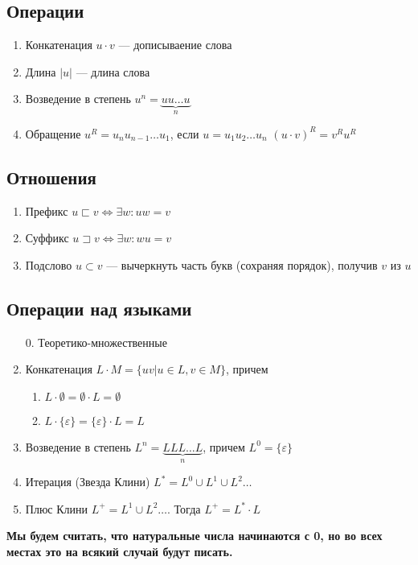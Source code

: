 \subsection{Операции}
\begin{enumerate}
    \item Конкатенация $u \cdot v$ --- дописываение слова
    \item Длина $|u|$ --- длина слова
    \item Возведение в степень $u^n = \underbrace{uu\dots u}_n$
    \item Обращение $u^R = u_nu_{n-1}\dots u_1$, если $u = u_1u_2\dots u_n$
    $(u\cdot v)^R = v^Ru^R$
\end{enumerate}
\subsection{Отношения}
\begin{enumerate}
    \item Префикс $u \sqsubset v \Leftrightarrow \exists w: uw = v$
    \item Суффикс $u \sqsupset v \Leftrightarrow \exists w: wu = v$
    \item Подслово $u \subset v$ --- вычеркнуть часть букв (сохраняя порядок), получив $v$ из $u$
\end{enumerate}
\subsection{Операции над языками}
\begin{enumerate}
    \item[0.] Теоретико-множественные
    \item Конкатенация $L\cdot M = \{uv | u \in L, v \in M\}$, причем
    \begin{enumerate}
        \item $L\cdot \emptyset = \emptyset\cdot L = \emptyset$
        \item $L\cdot \{\varepsilon\} = \{\varepsilon\}\cdot L = L$
    \end{enumerate}
    \item Возведение в степень $L^n = \underbrace{LLL\dots L}_n$, причем $L^0 = \{\varepsilon\}$
    \item Итерация (Звезда Клини) $L^*=L^0\cup L^1\cup L^2\dots$
    \item Плюс Клини $L^+=L^1\cup L^2\dots$. Тогда $L^+ = L^* \cdot L$
\end{enumerate}
\textbf{Мы будем считать, что натуральные числа начинаются с 0, но во всех местах это на всякий случай будут писать.}
\\\\

